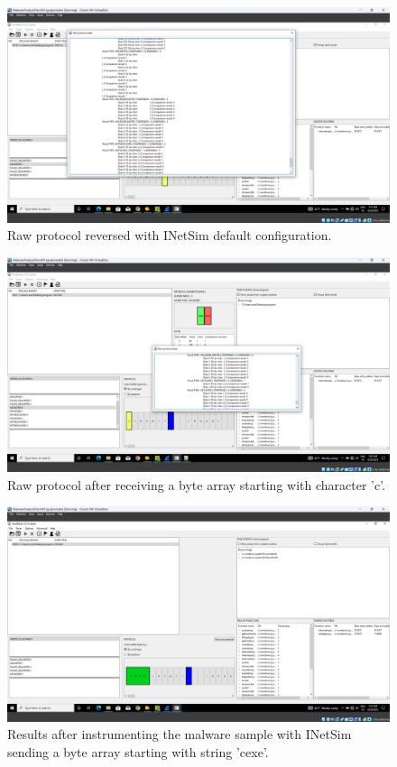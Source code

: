 \documentclass[conference]{IEEEtran}
\begin{document}
\begin{figure}[htbp]
    \centerline{\includegraphics[width=\textwidth]{images/sch_s6.png}}
    \caption{Raw protocol reversed with INetSim default configuration.}
    \label{figure:ap_sch_s6}
\end{figure}

\begin{figure}[htbp]
    \centerline{\includegraphics[width=\textwidth]{images/sch_s7.png}}
    \caption{Raw protocol after receiving a byte array starting with character 'c'.}
    \label{figure:ap_sch_s7}
\end{figure}

\begin{figure}[htbp]
    \centerline{\includegraphics[width=\textwidth]{images/sch_s8.png}}
    \caption{Results after instrumenting the malware sample with INetSim sending a byte array starting with string 'cexe'.}
    \label{figure:ap_sch_s8}
\end{figure}
\end{document}
